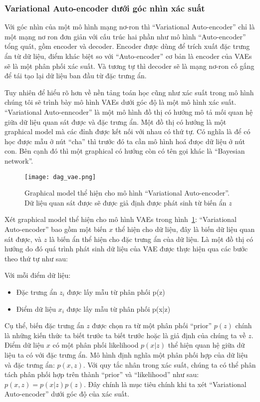         \subsubsection{Variational Auto-encoder dưới góc nhìn xác suất}
        Với góc nhìn của một mô hình mạng nơ-ron thì ``Variational Auto-encoder'' chỉ là một mạng nơ ron đơn giản với cấu trúc hai phần như mô hình ``Auto-encoder'' tổng quát, gồm encoder và decoder. 
        Encoder được dùng để trích xuất đặc trưng ẩn từ dữ liệu, điểm khác biệt so với ``Auto-encoder'' cơ bản là encoder của VAEs sẽ là một phân phối xác suất.
        Và tương tự thì decoder sẽ là mạng nơ-ron cố gắng để tái tạo lại dữ liệu ban đầu từ đặc trưng ẩn.

        Tuy nhiên để hiểu rõ hơn về nền tảng toán học cũng như xác suất trong mô hình chúng tôi sẽ trình bày mô hình VAEs dưới góc độ là một mô hình xác suất.
        ``Variational Auto-enncoder'' là một mô hình đồ thị có hướng mô tả mối quan hệ giữa dữ liệu quan sát được và đặc trưng ẩn. Một đồ thị có hướng là một graphical model mà các đỉnh được kết nối với nhau có thứ tự. Có nghĩa là để có học được mẫu ở nút ``cha'' thì trước đó ta cần mô hình hoá đưọc dữ liệu ở nút con. Bên cạnh đó thì một graphical có hướng còn có tên gọi khác là ``Bayesian network''.
        \begin{figure}
            \centering
            \texttt{[image: dag\_vae.png]}
            \caption{Graphical model thể hiện cho mô hình ``Variational Auto-encoder''. Dữ liệu quan sát được sẽ được giả định được phát sinh từ biến ẩn $z$} 
            \label{fig_dag_vae}
        \end{figure}
        
        Xét graphical model thể hiện cho mô hình VAEs trong hình~\ref{fig_dag_vae}:
        ``Variational Auto-encoder'' bao gồm một biến $x$ thể hiện cho dữ liệu, đây là biến dữ liệu quan sát được, và $z$ là biến ẩn thể hiện cho đặc trưng ẩn của dữ liệu. 
        Là một đồ thị có hướng do đó quá trình phát sinh dữ liệu của VAE được thực hiện qua các bước theo thứ tự như sau: 
        
        Với mỗi điểm dữ liệu: 
        \begin{itemize}
            \item Đặc trưng ẩn $z_i$ được lấy mẫu từ phân phối p(z)
            \item Điểm dữ liệu $x_i$ được lấy mẫu từ phân phối p(x|z)
        \end{itemize}

        Cụ thể, biến đặc trưng ẩn $z$ được chọn ra từ một phân phối ``prior'' $p(z)$ chính là những kiến thức ta biết trước ta biết trước hoặc là giả định của chúng ta về $z$. Điểm dữ liệu $x$ có một phân phối likelihood $p(x|z)$ thể hiện quan hệ giữa dữ liệu ta có với đặc trưng ẩn.
        Mô hình định nghĩa một phân phối hợp của dữ liệu và đặc trưng ẩn: $p(x,z)$. 
        Với quy tắc nhân trong xác suất, chúng ta có thể phân tách phân phối hợp trên thành ``prior'' và ``likelihood'' như sau: $p(x,z) = p(x|z)p(z)$. Đây chính là mục tiêu chính khi ta xét ``Variational Auto-encoder'' dưới góc độ của xác suất.


